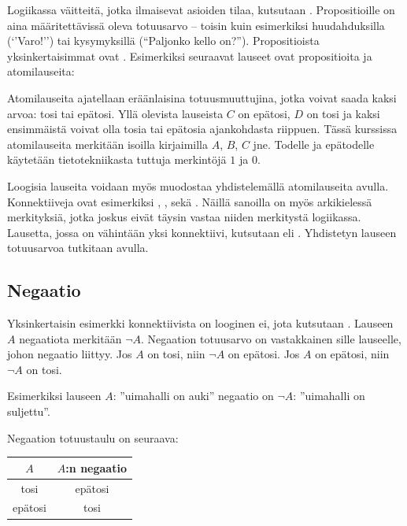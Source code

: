 Logiikassa väitteitä, jotka ilmaisevat asioiden tilaa, kutsutaan . Propositioille on aina määritettävissä oleva totuusarvo – toisin kuin esimerkiksi huudahduksilla (`'Varo!'') tai kysymyksillä (``Paljonko kello on?''). Propositioista yksinkertaisimmat ovat . Esimerkiksi seuraavat lauseet ovat propositioita ja atomilauseita:

Atomilauseita ajatellaan eräänlaisina totuusmuuttujina, jotka voivat saada kaksi arvoa: tosi tai epätosi. Yllä olevista lauseista $C$ on epätosi, $D$ on tosi ja kaksi ensimmäistä voivat olla tosia tai epätosia ajankohdasta riippuen. Tässä kurssissa atomilauseita merkitään isoilla kirjaimilla $A$, $B$, $C$ jne. Todelle ja epätodelle käytetään tietotekniikasta tuttuja merkintöjä $1$ ja $0$.

Loogisia lauseita voidaan myös muodostaa yhdistelemällä atomilauseita  avulla. Konnektiiveja ovat esimerkiksi , ,  sekä . Näillä sanoilla on myös arkikielessä merkityksiä, jotka joskus eivät täysin vastaa niiden merkitystä logiikassa. Lausetta, jossa on vähintään yksi konnektiivi, kutsutaan  eli . Yhdistetyn lauseen totuusarvoa tutkitaan  avulla.

\subsection*{Negaatio} Yksinkertaisin esimerkki konnektiivista on looginen ei, jota kutsutaan . Lauseen $A$ negaatiota merkitään $\lnot A$. Negaation totuusarvo on vastakkainen sille lauseelle, johon negaatio liittyy. Jos $A$ on tosi, niin $\lnot A$ on epätosi. Jos $A$ on epätosi, niin $\lnot A$ on tosi.

Esimerkiksi lauseen $A$: ''uimahalli on auki'' negaatio on $\lnot A$: ''uimahalli on suljettu''.

Negaation totuustaulu on seuraava:

\bigskip

\begin{center}
\begin{tabular}{|c|c|}\hline
$A$ & $A$:n negaatio \\ \hline
tosi & epätosi \\ 
epätosi & tosi \\
\hline
\end{tabular}
\end{center}

